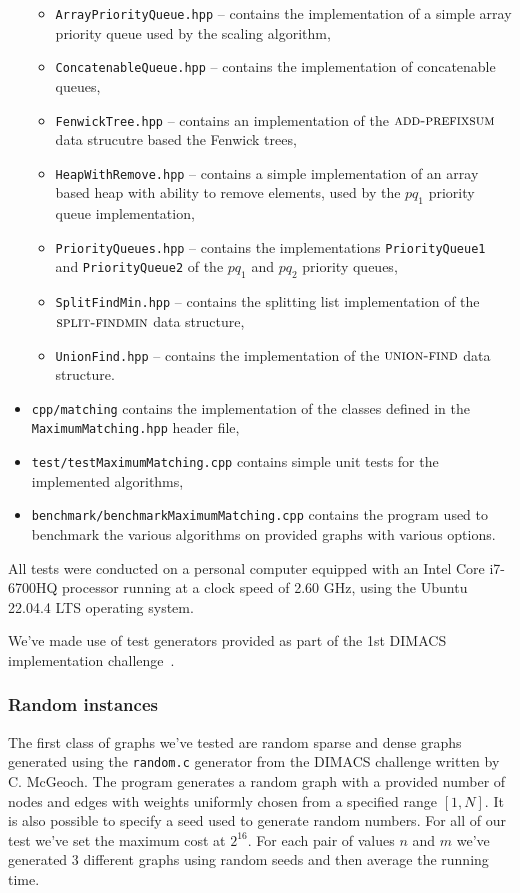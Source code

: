 \begin{itemize}
\begin{itemize}
        \item \texttt{ArrayPriorityQueue.hpp} – contains the implementation of a simple array priority queue used by the scaling algorithm,
        \item \texttt{ConcatenableQueue.hpp} – contains the implementation of concatenable queues,
        \item \texttt{FenwickTree.hpp} – contains an implementation of the $\textsc{add-prefixsum}$ data strucutre based the Fenwick trees,
        \item \texttt{HeapWithRemove.hpp} – contains a simple implementation of an array based heap with ability to remove elements, used by the $pq_1$ priority queue implementation,
        \item \texttt{PriorityQueues.hpp} – contains the implementations \texttt{PriorityQueue1} and \texttt{PriorityQueue2} of the $pq_1$ and $pq_2$ priority queues,
        \item \texttt{SplitFindMin.hpp} – contains the splitting list implementation of the $\textsc{split-findmin}$ data structure,
        \item \texttt{UnionFind.hpp} – contains the implementation of the $\textsc{union-find}$ data structure.
    \end{itemize}
    \item \texttt{cpp/matching} contains the implementation of the classes defined in the \texttt{MaximumMatching.hpp} header file,
    \item \texttt{test/testMaximumMatching.cpp} contains simple unit tests for the implemented algorithms,
    \item \texttt{benchmark/benchmarkMaximumMatching.cpp} contains the program used to benchmark the various algorithms on provided graphs with various options.
\end{itemize}

All tests were conducted on a personal computer equipped with an Intel Core i7-6700HQ processor running at a clock speed of 2.60 GHz, using the Ubuntu 22.04.4 LTS operating system.

We've made use of test generators provided as part of the 1st DIMACS implementation challenge~\cite{rutgersDIMACSImplementation}.

\subsubsection*{Random instances}

The first class of graphs we've tested are random sparse and dense graphs generated using the \texttt{random.c} generator from the DIMACS challenge written by C. McGeoch. The program generates a random graph with a provided number of nodes and edges with weights uniformly chosen from a specified range $[1, N]$. It is also possible to specify a seed used to generate random numbers. For all of our test we've set the maximum cost at $2^{16}$. For each pair of values $n$ and $m$ we've generated $3$ different graphs using random seeds and then average the running time.

